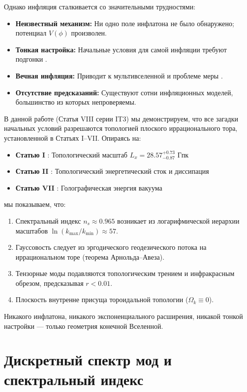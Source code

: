 \documentclass[12pt,a4paper]{article}
\begin{document}
Однако инфляция сталкивается со значительными трудностями:
\begin{itemize}
    \item \textbf{Неизвестный механизм:} Ни одно поле инфлатона не было обнаружено; потенциал $V(\phi)$ произволен.
    \item \textbf{Тонкая настройка:} Начальные условия для самой инфляции требуют подгонки \citep{Penrose2010}.
    \item \textbf{Вечная инфляция:} Приводит к мультивселенной и проблеме меры \citep{Guth2007}.
    \item \textbf{Отсутствие предсказаний:} Существуют сотни инфляционных моделей, большинство из которых непроверяемы.
\end{itemize}

В данной работе (Статья VIII серии IT3) мы демонстрируем, что все загадки начальных условий разрешаются топологией плоского иррационального тора, установленной в Статьях I–VII. Опираясь на:
\begin{itemize}
    \item \textbf{Статью I} \citep{Logvinovich2026a}: Топологический масштаб $L_x = 28.57^{+0.73}_{-0.87}$ Гпк
    \item \textbf{Статью II} \citep{Logvinovich2026b}: Топологический энергетический сток и диссипация
    \item \textbf{Статью VII} \citep{Logvinovich2026d}: Голографическая энергия вакуума
\end{itemize}

мы показываем, что:
\begin{enumerate}
    \item Спектральный индекс $n_s \approx 0.965$ возникает из логарифмической иерархии масштабов $\ln(k_{\max}/k_{\min}) \approx 57$.
    \item Гауссовость следует из эргодического геодезического потока на иррациональном торе (теорема Арнольда–Авеза).
    \item Тензорные моды подавляются топологическим трением и инфракрасным обрезом, предсказывая $r < 0.01$.
    \item Плоскость внутренне присуща тороидальной топологии ($\Omega_k \equiv 0$).
\end{enumerate}

Никакого инфлатона, никакого экспоненциального расширения, никакой тонкой настройки — только геометрия конечной Вселенной.

\section{Дискретный спектр мод и спектральный индекс}
\end{document}
